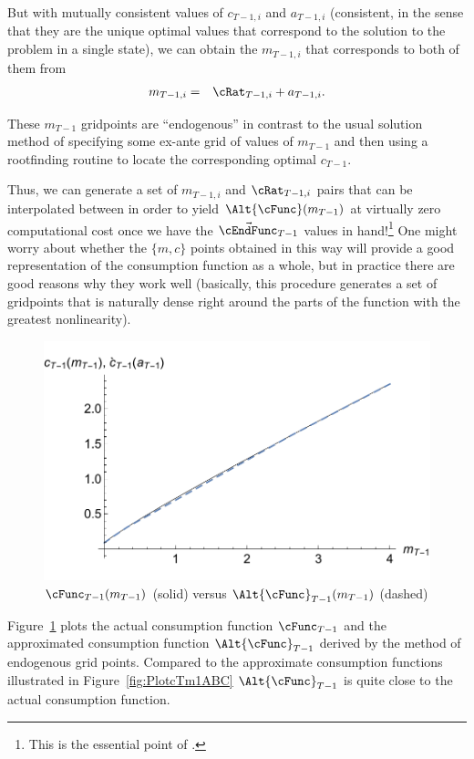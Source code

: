 \documentclass[titlepage]{\econtex}
\begin{document}
But with mutually consistent values of ${c}_{T-1,i}$ and ${a}_{T-1,i}$ (consistent, in the sense that they are the unique optimal
values that correspond to the solution to the problem in a single state), we can
obtain the ${m}_{T-1,i}$ that corresponds to both of them from
\begin{eqnarray}
 {m}_{T-1,i} & = & {\cRat}_{T-1,i}+{a}_{T-1,i}.
\end{eqnarray}

These ${m}_{T-1}$ gridpoints are ``endogenous'' in contrast to the usual solution method of
specifying some ex-ante grid of values of ${m}_{T-1}$ and then using a rootfinding
routine to locate the corresponding optimal ${c}_{T-1}$.

Thus, we can generate a set of ${m}_{T-1,i}$ and ${\cRat}_{T-1,i}$
pairs that can be interpolated between in order to yield
$\Alt{\cFunc}({m}_{T-1})$ at virtually zero computational cost once we
have the $\vec{\cEndFunc}_{T-1}$ values in hand!\footnote{This is
  the essential point of \cite{carrollEGM}.} One might worry
about whether the $\{{m},{c}\}$ points obtained in this way will provide a
good representation of the consumption function as a whole, but in
practice there are good reasons why they work well (basically, this
procedure generates a set of gridpoints that is naturally dense right
around the parts of the function with the greatest nonlinearity).
\hypertarget{PlotComparecTm1AD}{}
\begin{figure}
        \includegraphics{./Figures/PlotComparecTm1AD}
        \caption{$\cFunc_{T-1}({m}_{T-1})$ (solid) versus $\Alt{\cFunc}_{T-1}({m}_{T-1})$ (dashed)}
        \label{fig:ComparecTm1AD}
\end{figure}
Figure~\ref{fig:ComparecTm1AD} plots the actual consumption function
${\cFunc}_{T-1}$ and the approximated consumption function $\Alt{\cFunc}_{T-1}$
derived by the method of endogenous grid points. Compared to the approximate consumption
functions illustrated in Figure~\ref{fig:PlotcTm1ABC} $\Alt{\cFunc}_{T-1}$ is quite close
to the actual consumption function.
\end{document}
